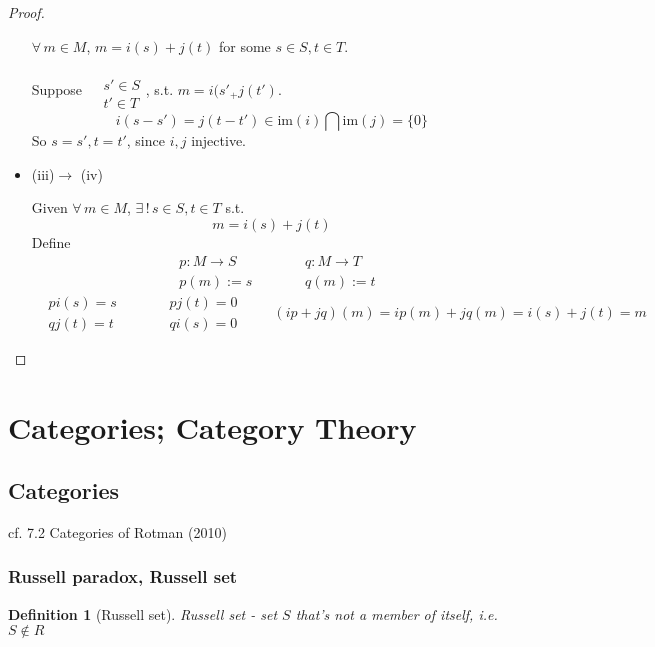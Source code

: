 \documentclass[10pt]{amsart}
\newtheorem{definition}{Definition}
\begin{document}
\begin{multicols*}{2}
\begin{proof}
\begin{itemize}
$\forall \, m \in M$, $m=i(s) + j(t)$ for some $s\in S,t\in T$.  

Suppose $\begin{aligned} & \quad \\ 
	& s' \in S \\
& t' \in T \end{aligned}$, s.t. $m=i(s'_ + j(t')$.  
\[
i(s-s') = j(t-t') \in \text{im}(i) \bigcap \text{im}(j) = \lbrace 0 \rbrace
\]
So $s=s',t=t'$, since $i,j$ injective.  
\item (iii)$\to$ (iv)   

Given $\forall \, m \in M$, $\exists \, ! \, s\in S,t\in T$ s.t. 
\[
m=i(s) + j(t)
\]
Define 
\[
\begin{aligned}
	& p:M \to S \\ 
	& p(m) := s
\end{aligned} \qquad \, \begin{aligned}
	& q: M \to T \\ 
	& q(m) := t
\end{aligned}
\]
\[
\begin{aligned}
	& pi(s) = s \\ 
	& qj(t) = t 
\end{aligned} \qquad \, \begin{aligned}
& pj(t) =0  \\
& qi(s) = 0 \end{aligned} \qquad \, 
(ip+jq)(m) = ip(m) + jq(m) = i(s) + j(t) = m 
\]
\end{itemize}
\end{proof}

\section{Categories; Category Theory}  

\subsection{Categories}

cf. 7.2 Categories of Rotman (2010) \cite{JRotman2010}

\subsubsection{Russell paradox, Russell set}  

\begin{definition}[Russell set]
Russell set  - set $S$ that's not a member of itself, i.e. $S\notin R$
\end{definition}


\end{multicols*}
\end{document}

